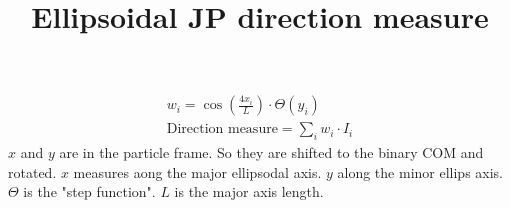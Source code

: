 \documentclass{article}
\title{Ellipsoidal JP direction measure}
\begin{document}
\maketitle

\begin{gather*}
w_i = \cos \left(\frac{4x_i}{L} \right) \cdot \Theta (y_i)\\
\text{Direction measure} = \sum_i w_i \cdot I_i
\end{gather*}
$x$ and $y$ are in the particle frame. So they are shifted to the binary COM and rotated. $x$ measures aong the major ellipsodal axis. $y$ along the minor ellips axis. $\Theta$ is the "step function". $L$ is the major axis length.  
\end{document}
